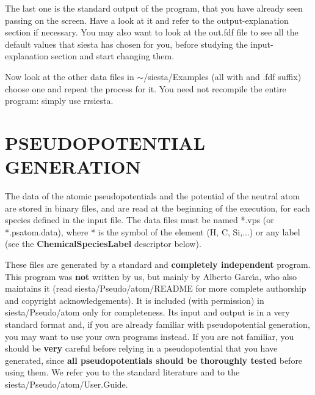 The last one is the standard output of the program, that you
have already seen passing on the screen. Have a look at it
and refer to the output-explanation section if necessary.
You may also want to look at the out.fdf file to see all
the default values that siesta has chosen for you, before
studying the input-explanation section and start changing them.

Now look at the other data files in $\sim$/siesta/Examples
(all with and .fdf suffix) choose one and repeat the process for it.
You need not recompile the entire program: simply use 
rrsiesta.



\section{PSEUDOPOTENTIAL GENERATION}


The data of the atomic pseudopotentials and the potential
of the neutral atom are stored in binary files, and
are read at the beginning of the execution, for each
species defined in the input file. The data files must
be named *.vps (or *.psatom.data), where * is the symbol of the
element (H, C, Si,...) or any label (see the 
{\bf ChemicalSpeciesLabel}
descriptor below).

These files are generated by a standard and {\bf completely independent}
program. This program was {\bf not} written by us, but mainly by 
Alberto Garc\'{\i}a, who also maintains it
(read siesta/Pseudo/atom/README for more complete authorship and 
copyright acknowledgements).
It is included (with permission) in siesta/Pseudo/atom only for
completeness. Its input and output is in a very standard format and,
if you are already familiar with pseudopotential generation, you may want 
to use your own programs instead. If you are not familiar, you should
be {\bf very} careful before relying in a pseudopotential that you
have generated, since {\bf all pseudopotentials should be thoroughly
tested} before using them. We refer you to the standard literature
and to the siesta/Pseudo/atom/User.Guide.



%



